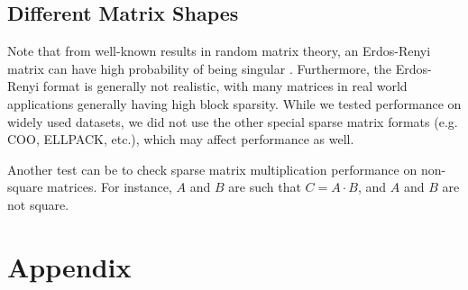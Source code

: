\documentclass[12pt]{article}
\begin{document}
\subsection{Different Matrix Shapes}
\hspace{0.5cm}Note that from well-known results in random matrix theory, an Erdos-Renyi matrix can have high probability of being singular \cite{singular}. Furthermore, the Erdos-Renyi format is generally not realistic, with many matrices in real world applications generally having high block sparsity. While we tested performance on widely used datasets, we did not use the other special sparse matrix formats (e.g. COO, ELLPACK, etc.), which may affect performance as well. 

\hspace{0.5cm}Another test can be to check sparse matrix multiplication performance on non-square matrices. For instance, $A$ and $B$ are such that $C = A \cdot B$, and $A$ and $B$ are not square.


\newpage




\section{Appendix} \label{appendix}

\newpage 
\end{document}
